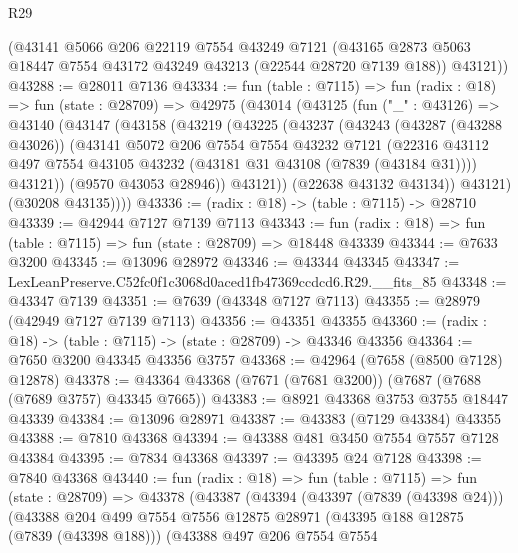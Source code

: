 \begin{lexlean}{R29}
\begin{coremodule}
      (@43141
        @5066
        @206
        @22119
        @7554
        @43249
        @7121
        (@43165 @2873 @5063 @18447 @7554 @43172 @43249 @43213 (@22544 @28720 @7139 @188))
        @43121))
@43288 := @28011 @7136
@43334 := fun (table : @7115) =>
  fun (radix : @18) =>
  fun (state : @28709) =>
  @42975
    (@43014
      (@43125
        (fun ("_" : @43126) =>
        @43140
          (@43147
            (@43158
              (@43219
                (@43225
                  (@43237
                    (@43243
                      (@43287 (@43288 @43026))
                      (@43141
                        @5072
                        @206
                        @7554
                        @7554
                        @43232
                        @7121
                        (@22316
                          @43112
                          @497
                          @7554
                          @43105
                          @43232
                          (@43181 @31 @43108 (@7839 (@43184 @31))))
                        @43121))
                    (@9570 @43053 @28946))
                  @43121))
              (@22638 @43132 @43134))
            @43121)
          (@30208 @43135))))
@43336 := (radix : @18) -> (table : @7115) -> @28710
@43339 := @42944 @7127 @7139 @7113
@43343 := fun (radix : @18) => fun (table : @7115) => fun (state : @28709) => @18448 @43339
@43344 := @7633 @3200
@43345 := @13096 @28972
@43346 := @43344 @43345
@43347 := LexLeanPreserve.C52fc0f1c3068d0aced1fb47369ccdcd6.R29.__fits_85
@43348 := @43347 @7139
@43351 := @7639 (@43348 @7127 @7113)
@43355 := @28979 (@42949 @7127 @7139 @7113)
@43356 := @43351 @43355
@43360 := (radix : @18) -> (table : @7115) -> (state : @28709) -> @43346 @43356
@43364 := @7650 @3200 @43345 @43356 @3757
@43368 := @42964 (@7658 (@8500 @7128) @12878)
@43378 := @43364 @43368 (@7671 (@7681 @3200)) (@7687 (@7688 (@7689 @3757) @43345 @7665))
@43383 := @8921 @43368 @3753 @3755 @18447 @43339
@43384 := @13096 @28971
@43387 := @43383 (@7129 @43384) @43355
@43388 := @7810 @43368
@43394 := @43388 @481 @3450 @7554 @7557 @7128 @43384
@43395 := @7834 @43368
@43397 := @43395 @24 @7128
@43398 := @7840 @43368
@43440 := fun (radix : @18) =>
  fun (table : @7115) =>
  fun (state : @28709) =>
  @43378
    (@43387
      (@43394
        (@43397 (@7839 (@43398 @24)))
        (@43388
          @204
          @499
          @7554
          @7556
          @12875
          @28971
          (@43395 @188 @12875 (@7839 (@43398 @188)))
          (@43388
            @497
            @206
            @7554
            @7554

\end{coremodule}
\end{lexlean}

